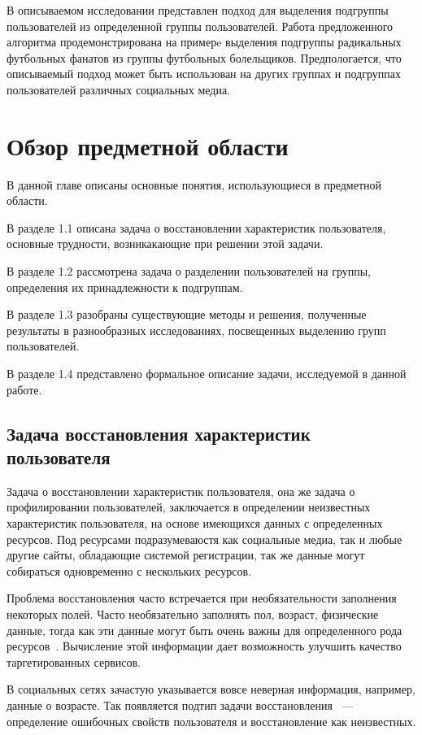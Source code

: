 \documentclass[annotation,times,page4]{itmo-student-thesis}
\begin{document}
В описываемом исследовании представлен подход для выделения подгруппы пользователей из определенной группы пользователей. Работа предложенного алгоритма продемонстрирована на примерe выделения подгруппы радикальных футбольных фанатов из группы футбольных болельщиков. Предпологается, что описываемый подход может быть использован на других группах и подгруппах пользователей различных социальных медиа.

\chapter{Обзор предметной области}
В данной главе описаны основные понятия, использующиеся в предметной области.

В разделе 1.1 описана задача о восстановлении характеристик пользователя, основные трудности, возникакающие при решении этой задачи. 

В разделе 1.2 рассмотрена задача о разделении пользователей на группы, определения их принадлежности к подгруппам.

В разделе 1.3 разобраны существующие методы и решения, полученные результаты в разнообразных исследованиях, посвещенных выделению групп пользователей.

В разделе 1.4 представлено формальное описание задачи, исследуемой в данной работе.

\section{Задача восстановления характеристик пользователя}
Задача о восстановлении характеристик пользователя, она же задача о профилировании пользователей, заключается в определении неизвестных характеристик пользователя, на основе имеющихся данных с определенных ресурсов. Под ресурсами подразумеваюстя как социальные медиа, так и любые другие сайты, обладающие системой регистрации, так же данные могут собираться одновременно с нескольких ресурсов.

Проблема восстановления часто встречается при необязательности заполнения некоторых полей. Часто необязательно заполнять пол, возраст, физические данные, тогда как эти данные могут быть очень важны для определенного рода ресурсов~\cite{peersman2011predicting, turdakov2013opredelenie, schwartz2013personality}. Вычисление этой информации дает возможность улучшить качество таргетированных сервисов.

В социальных сетях зачастую указывается вовсе неверная информация, например, данные о возрасте. Так появляется подтип задачи восстановления ~--- определение ошибочных свойств пользователя и восстановление как неизвестных.
\end{document}
